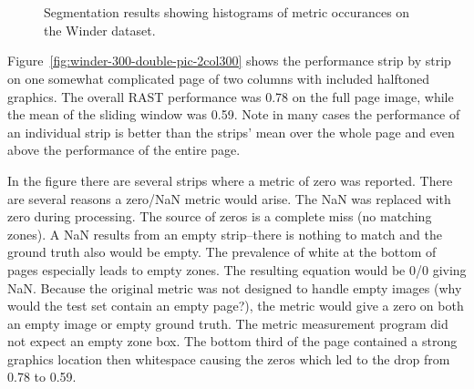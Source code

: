\documentclass[conference]{IEEEtran}
\begin{document}
\begin{figure*}[300-results]
\begin{center}
 {
  \\
  \\
 }
\end{center}
\caption{Segmentation results showing histograms of metric occurances on the Winder dataset.}
\label{fig:winder_2x2}
\end{figure*}


%

Figure~\ref{fig:winder-300-double-pic-2col300} shows the performance strip by
strip on one somewhat complicated page of two columns with included halftoned
graphics.  The overall RAST performance was 0.78 on the full page image, while
the mean of the sliding window was 0.59.  Note in many cases the performance of
an individual strip is better than the strips' mean over the whole page and
even above the performance of the entire page.  

In the figure there are several strips where a metric of zero was reported.
There are several reasons a zero/NaN metric would arise. The NaN was replaced
with zero during processing.
The source of zeros is a complete miss (no matching zones). 
A NaN results from an empty strip--there is
nothing to match and the ground truth also would be empty. 
The prevalence of white at the bottom of pages especially leads to empty zones. 
The resulting
equation would be 0/0 giving NaN. Because the original
metric was not designed to handle empty images (why would the test set contain
an empty page?), the metric would give a zero on both an empty image or empty ground
truth. 
The metric measurement program did not
expect an empty zone box. 
The bottom third of the page contained a strong graphics location then
whitespace causing the zeros which led to the drop from 0.78 to 0.59. 
\end{document}
